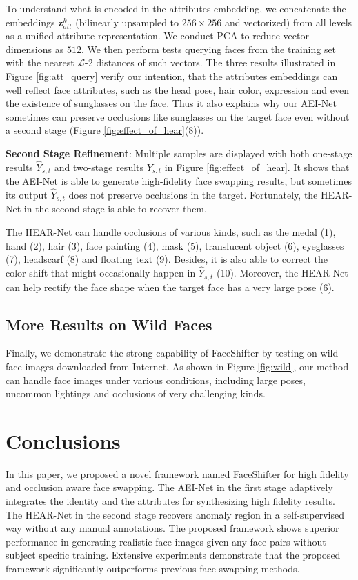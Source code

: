 To understand what is encoded in the attributes embedding, we concatenate the embeddings $\bm{z}_{att}^k$ (bilinearly upsampled to $256\times 256$ and vectorized) from all levels as a unified attribute representation. We conduct PCA to reduce vector dimensions as $512$. 
We then perform tests querying faces from the training set with the nearest $\mathcal{L}$-2 distances of such vectors. The three results illustrated in Figure \ref{fig:att_query} verify our intention, that the attributes embeddings can well reflect face attributes, such as the head pose, hair color, expression and even the existence of sunglasses on the face. Thus it also explains why our AEI-Net sometimes can preserve occlusions like sunglasses on the target face even without a second stage (Figure \ref{fig:effect_of_hear}(8)).

\noindent\textbf{Second Stage Refinement}:
Multiple samples are displayed with both one-stage results $\hat{Y}_{s,t}$ and two-stage results $Y_{s,t}$ in Figure \ref{fig:effect_of_hear}. 
It shows that the AEI-Net is able to generate high-fidelity face swapping results, but sometimes its output $\hat{Y}_{s,t}$ does not preserve occlusions in the target.
Fortunately, the HEAR-Net in the second stage is able to recover them. 

The HEAR-Net can handle occlusions of various kinds, such as the medal (1), hand (2), hair (3), face painting (4), mask (5), translucent object (6), eyeglasses (7), headscarf (8) and floating text (9). 
Besides, it is also able to correct the color-shift that might occasionally happen in $\hat{Y}_{s,t}$ (10). 
Moreover, the HEAR-Net can help rectify the face shape when the target face has a very large pose (6).

\subsection{More Results on Wild Faces}

Finally, we demonstrate the strong capability of FaceShifter by testing on wild face images downloaded from Internet. 
As shown in Figure \ref{fig:wild}, our method can handle face images under various conditions, including large poses, uncommon lightings and occlusions of very challenging kinds. 

\section{Conclusions}

In this paper, we proposed a novel framework named FaceShifter for high fidelity and occlusion aware face swapping. The AEI-Net in the first stage adaptively integrates the identity and the attributes for synthesizing high fidelity results. The HEAR-Net in the second stage recovers anomaly region in a self-supervised way without any manual annotations.  
The proposed framework shows superior performance in generating realistic face images given any face pairs without subject specific training. 
Extensive experiments demonstrate that the proposed framework significantly outperforms previous face swapping methods.

{\small
}

\cleardoublepage

